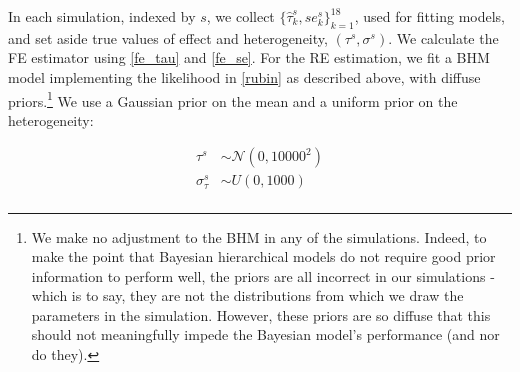 \documentclass[12pt]{article}
\begin{document}
In each simulation, indexed by $s$, we collect $\{\hat{\tau}_k^s, se_k^s\}_{k=1}^18$, used for fitting models, and set aside true values of effect and heterogeneity, $(\tau^{s}, \sigma^{s})$. We calculate the FE estimator using \eqref{fe_tau} and \eqref{fe_se}. For the RE estimation, we fit a BHM model implementing the likelihood in \eqref{rubin} as described above, with diffuse priors.\footnote{We make no adjustment to the BHM in any of the simulations. Indeed, to make the point that Bayesian hierarchical models do not require good prior information to perform well, the priors are all incorrect in our simulations - which is to say, they are not the distributions from which we draw the parameters in the simulation. However, these priors are so diffuse that this should not meaningfully impede the Bayesian model's performance (and nor do they).} We use a Gaussian prior on the mean and a uniform prior on the heterogeneity:

% 
% 



\begin{equation}
\begin{aligned}
\tau^s &\sim \mathcal{N}(0, 10000^2) \\
\sigma_{\tau}^s &\sim U(0,1000) \\
\end{aligned}
\end{equation}
\end{document}
